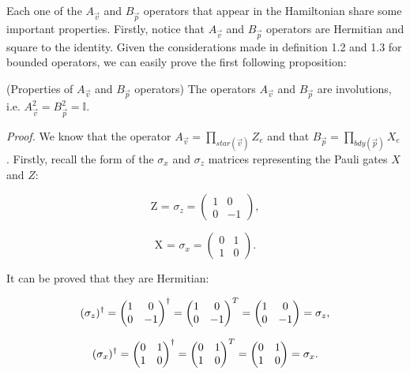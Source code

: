 \documentclass{Configuration_Files/PoliMi3i_thesis}
\begin{document}
Each one of the $A_{\vec{v}}$ and $B_{\vec{p}}$ operators that appear in the Hamiltonian share some important properties. Firstly, notice that $A_{\vec{v}}$ and $B_{\vec{p}}$ operators are Hermitian and square to the identity. Given the considerations made in definition 1.2 and 1.3 for bounded operators, we can easily prove the first following proposition:

\begin{proposition} (Properties of $A_{\vec{v}}$ and $B_{\vec{p}}$ operators)
The operators $A_{\vec{v}}$ and $B_{\vec{p}}$ are involutions, i.e. $A_{\vec{v}}^2= B_{\vec{p}}^2=\mathbb{I}$.
\end{proposition}
	
\textit{Proof.}
We know that the operator $A_{\vec{v}} = \prod_{star(\vec{v})} Z_e$ and that $ B_{\vec{p}} = \prod_{bdy(\vec{p})} X_e  $ .\newline
Firstly, recall the form of the $\sigma_x$ and $\sigma_z$ matrices representing the Pauli gates $X$ and $Z$:



\[
\text{Z = $\sigma_z$} =
\begin{pmatrix}
	1 & 0 \\
	0 & -1
\end{pmatrix},
\]


\[
\text{X = $\sigma_x$} =
\begin{pmatrix}
	0 & 1 \\
	1 & 0
\end{pmatrix}.
\]


It can be proved that they are Hermitian:\newline

\[
\text{$( \sigma_z )^{\dagger}$} = 
\begin{pmatrix}
	1 & 0 \\
	0 & -1
\end{pmatrix} ^\dagger =
\begin{pmatrix}
	1 & 0 \\
	0 & -1
\end{pmatrix}^T =
\begin{pmatrix}
	1 & 0 \\
	0 & -1
\end{pmatrix}
= \text{$ \sigma_z $},
\]


\[
\text{$( \sigma_x )^{\dagger}$} = 
\begin{pmatrix}
	0 & 1 \\
	1 & 0
\end{pmatrix} ^\dagger =
\begin{pmatrix}
	0 & 1 \\
	1 & 0
\end{pmatrix}^T =
\begin{pmatrix}
	0 & 1 \\
	1 & 0
\end{pmatrix}
= \text{$ \sigma_x $}.
\]
\end{document}
